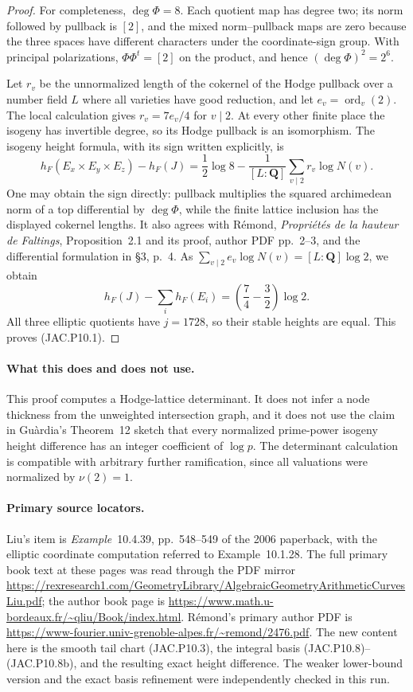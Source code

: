 \documentclass[11pt,a4paper]{article}
\begin{document}
\begin{proof}
For completeness, $\deg\Phi=8$. Each quotient map has degree two;
its norm followed by pullback is $[2]$, and the mixed norm--pullback
maps are zero because the three spaces have different characters
under the coordinate-sign group. With principal polarizations,
$\Phi\Phi^t=[2]$ on the product, and hence
$(\deg\Phi)^2=2^6$.

Let $r_v$ be the unnormalized length of the cokernel of the Hodge
pullback over a number field $L$ where all varieties have good
reduction, and let $e_v=\operatorname{ord}_v(2)$.
The local calculation gives $r_v=7e_v/4$ for $v\mid2$.
At every other finite place the isogeny has invertible degree,
so its Hodge pullback is an isomorphism.
The isogeny height formula, with its sign written explicitly, is
\[
 h_F(E_x\times E_y\times E_z)-h_F(J)
 =\frac12\log8-
   \frac1{[L:\mathbf Q]}\sum_{v\mid2} r_v\log N(v).
                                                        \tag{JAC.P10.9}
\]
One may obtain the sign directly: pullback multiplies the squared
archimedean norm of a top differential by $\deg\Phi$, while the
finite lattice inclusion has the displayed cokernel lengths.
It also agrees with R\'emond, \emph{Propri\'et\'es de la hauteur
de Faltings}, Proposition~2.1 and its proof, author PDF pp.~2--3,
and the differential formulation in \S3, p.~4.
As $\sum_{v\mid2}e_v\log N(v)=[L:\mathbf Q]\log2$, we obtain
\[
 h_F(J)-\sum_i h_F(E_i)
 =\left(\frac74-\frac32\right)\log2.
\]
All three elliptic quotients have $j=1728$, so their stable heights
are equal. This proves (JAC.P10.1).
\end{proof}

\paragraph{What this does and does not use.}
This proof computes a Hodge-lattice determinant.
It does not infer a node thickness from the unweighted intersection
graph, and it does not use the claim in Gu\`ardia's Theorem~12 sketch
that every normalized prime-power isogeny height difference has an
integer coefficient of $\log p$. The determinant calculation is
compatible with arbitrary further ramification, since all valuations
were normalized by $\nu(2)=1$.

\paragraph{Primary source locators.}
Liu's item is \emph{Example}~10.4.39, pp.~548--549 of the 2006
paperback, with the elliptic coordinate computation referred to
Example~10.1.28. The full primary book text at these pages was read
through the PDF mirror
\url{https://rexresearch1.com/GeometryLibrary/AlgebraicGeometryArithmeticCurvesLiu.pdf};
the author book page is
\url{https://www.math.u-bordeaux.fr/~qliu/Book/index.html}.
R\'emond's primary author PDF is
\url{https://www-fourier.univ-grenoble-alpes.fr/~remond/2476.pdf}.
The new content here is the smooth tail chart (JAC.P10.3), the
integral basis (JAC.P10.8)--(JAC.P10.8b), and the resulting exact
height difference. The weaker lower-bound version and the exact
basis refinement were independently checked in this run.
\end{document}
